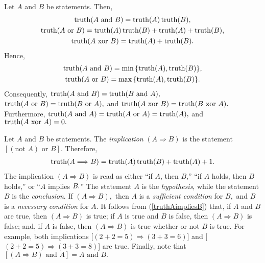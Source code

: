 Let $A$ and $B$ be statements.
%
%
Then,
%
%
\begin{gather}
%
\truth(A\mbox{ and }B) = \truth(A)\truth(B),\\
%
%
\truth(A\mbox{ or }B) = \truth(A)\truth(B)+\truth(A)+\truth(B),\\
%
%
\truth(A\mbox{ xor }B) = \truth(A)+\truth(B).
%
\end{gather}
%
Hence,
%
\begin{gather}
%
\truth(A\mbox{ and }B) = \min\,\{\truth(A),\truth(B)\},\\
%
%
\truth(A\mbox{ or }B) = \max\,\{\truth(A),\truth(B)\}.
%
\end{gather}
%
%
%
%
%
%
Consequently, $\operatorname{truth}(A\mbox{ and }B) = \operatorname{truth}(B\mbox{ and }A),$ $\operatorname{truth}(A\mbox{ or }B) = \operatorname{truth}(B\mbox{ or }A),$ and $\operatorname{truth}(A\mbox{ xor }B) = \operatorname{truth}(B\mbox{ xor }A).$
%
Furthermore,
%
$\operatorname{truth}(A\mbox{ and }A) = \operatorname{truth}(A\mbox{ or }A) =  \operatorname{truth}(A),$ and
%
%
%
$\operatorname{truth}(A\mbox{ xor }A) = 0.$
%







Let $A$ and $B$ be statements.  The {\it implication}
%
%
$(A\Longrightarrow B)$ is the statement $[(\mbox{not }A) \mbox{ or }B].$
%
Therefore,
%
\begin{align}
%
\truth(A\Longrightarrow B) = \truth(A)\truth(B) + \truth(A)+1.\label{truthAimpliesB}
%
\end{align}
%
The implication $(A\Longrightarrow B)$ is read as either ``if $A$, then $B$,'' ``if $A$ holds, then $B$ holds,'' or
``$A$ implies $B\mspace{-1mu}.$''
The statement $A$ is the {\it hypothesis}, while the statement $B$ is the {\it conclusion}.
%
%
%
If $(A\Longrightarrow B),$  then $A$ is a {\it sufficient condition} for $B,$ and $B$ is a {\it necessary condition} for $A.$
%
%
%
%
It follows from (\ref{truthAimpliesB}) that,
%
if $A$ and $B$ are true, then $(A\Longrightarrow B)$ is true;
%
if $A$ is true and $B$ is false, then $(A\Longrightarrow B)$ is false;
%
and, if $A$ is false, then $(A\Longrightarrow B)$ is true whether or not $B$ is true.
%
For example, both implications [$(2+2=5) \Longrightarrow (3+3=6)$] and [$(2+2=5) \Longrightarrow (3+3=8)$] are true.
%
Finally, note that $[(A\Longrightarrow B)\mbox{ and } A] = A \mbox{ and } B.$

